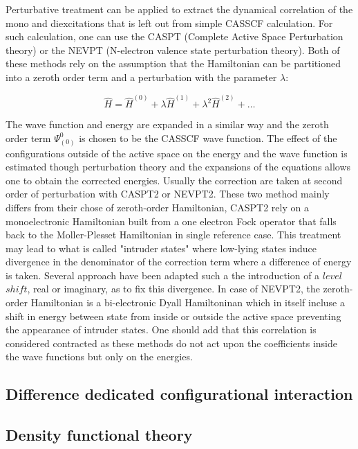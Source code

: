\documentclass[12pt]{article}
\numberwithin{equation}{section}
\begin{document}
Perturbative treatment can be applied to extract the dynamical correlation of the mono and diexcitations that is left out from simple CASSCF calculation. For such calculation, one can use the CASPT (Complete Active Space Perturbation theory)
or the NEVPT (N-electron valence state perturbation theory). Both of these methods rely on the assumption that the Hamiltonian can be partitioned into a zeroth order term and a perturbation with the parameter $\lambda$:

\begin{equation}
    \hat{H}=\hat{H}^{(0)}+\lambda\hat{H}^{(1)}+\lambda^2 \hat{H}^{(2)}+\ldots
\end{equation}


The wave function and energy are expanded in a similar way and the zeroth order term $\Psi_{(0)}^{0}$ is chosen to be the CASSCF wave function. 
The effect of the configurations outside of the active space on the energy and the wave function is estimated though perturbation theory and the expansions of the equations allows one to obtain the corrected energies.
Usually the correction are taken at second order of perturbation with CASPT2 or NEVPT2. These two method mainly differs from their chose of zeroth-order Hamiltonian, CASPT2 rely on a monoelectronic Hamiltonian built from a one electron Fock operator that falls back to the Moller-Plesset Hamiltonian in single reference case. 
This treatment may lead to what is called "intruder states" where low-lying states induce divergence in the denominator of the correction term where a difference of energy is taken. Several approach have been adapted such a the introduction of a $level$ $shift$, real or imaginary, as to fix this divergence.
In case of NEVPT2, the zeroth-order Hamiltonian is a bi-electronic Dyall Hamiltoninan which in itself incluse a shift in energy between state from inside or outside the active space preventing the appearance of intruder states.
One should add that this correlation is considered contracted as these
methods do not act upon the coefficients inside the wave functions but only on the
energies.

\subsection{Difference dedicated configurational interaction}



\subsection{Density functional theory}
\end{document}
